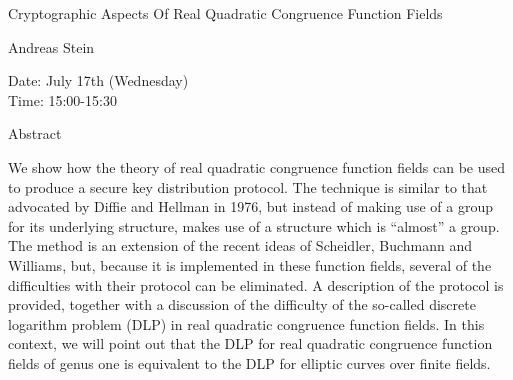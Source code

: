 \begin{center}
\LARGE
Cryptographic Aspects Of Real Quadratic Congruence
                        Function Fields 
\end{center}

\begin{center}
\Large
Andreas Stein
\end{center}

\noindent
Date:  July 17th (Wednesday)\\
Time: 15:00-15:30\\

\begin{center}
\large
Abstract
\end{center}

We show how the theory of real quadratic congruence function fields can be used to produce a
secure key distribution protocol. The technique is similar to that advocated by Diffie and Hellman
in 1976, but instead of making use of a group for its underlying structure, makes use of a structure
which is ``almost'' a group. The method is an extension of the recent ideas of Scheidler, Buchmann
and Williams, but, because it is implemented in these function fields, several of the difficulties
with their protocol can be eliminated. A description of the protocol is provided, together with a
discussion of the difficulty of the so-called discrete logarithm problem (DLP) in real quadratic
congruence function fields. In this context, we will point out that the DLP for real quadratic
congruence function fields of genus one is equivalent to the DLP for elliptic curves over finite
fields. 

